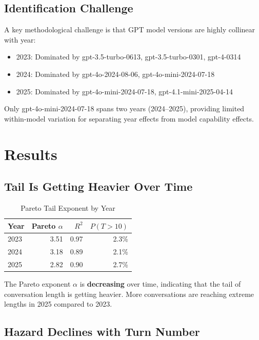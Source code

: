 \documentclass[11pt]{article}
\begin{document}
\subsection{Identification Challenge}

A key methodological challenge is that GPT model versions are highly collinear with year:
\begin{itemize}
    \item 2023: Dominated by gpt-3.5-turbo-0613, gpt-3.5-turbo-0301, gpt-4-0314
    \item 2024: Dominated by gpt-4o-2024-08-06, gpt-4o-mini-2024-07-18
    \item 2025: Dominated by gpt-4o-mini-2024-07-18, gpt-4.1-mini-2025-04-14
\end{itemize}

Only gpt-4o-mini-2024-07-18 spans two years (2024--2025), providing limited within-model variation for separating year effects from model capability effects.

\section{Results}

\subsection{Tail Is Getting Heavier Over Time}

\begin{table}[h]
\centering
\caption{Pareto Tail Exponent by Year}
\label{tab:pareto}
\begin{tabular}{lrrr}
\toprule
Year & Pareto $\alpha$ & $R^2$ & $P(T > 10)$ \\
\midrule
2023 & 3.51 & 0.97 & 2.3\% \\
2024 & 3.18 & 0.89 & 2.1\% \\
2025 & 2.82 & 0.90 & 2.7\% \\
\bottomrule
\end{tabular}
\end{table}

The Pareto exponent $\alpha$ is \textbf{decreasing} over time, indicating that the tail of conversation length is getting heavier. More conversations are reaching extreme lengths in 2025 compared to 2023.

\subsection{Hazard Declines with Turn Number}
\end{document}
